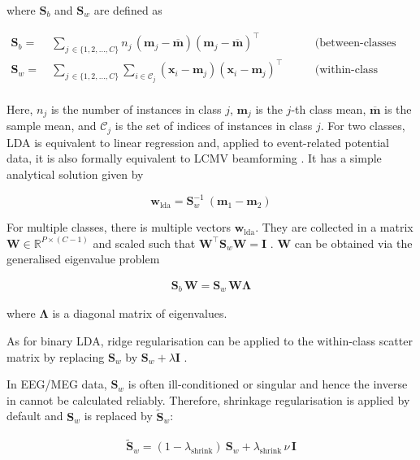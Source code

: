 \documentclass[utf8]{frontiersSCNS} %
\newcommand{\m}{\mathbf{m}}
\newcommand{\mbar}{\overline{\m}}
\newcommand{\mm}[1]{\m_{#1}}
\newcommand{\w}{\mathbf{w}}
\newcommand{\x}{\mathbf{x}}
\newcommand{\I}{\mathbf{I}}
\newcommand{\R}{\mathbb{R}}
\renewcommand{\S}{\mathbf{S}}
\newcommand{\W}{\mathbf{W}}
\begin{document}
where $\S_b$ and $\S_w$ are defined as

\begin{equation*}
\begin{alignedat}{2}
\S_b =\ & \sum_{j\,\in\{1,2,...,C\}}n_j\,(\mm{j} -\mbar) (\mm{j} - \mbar)^\top\ \quad &&\text{(between-classes scatter)}\\
\S_w =\ & \sum_{j\,\in\{1,2,...,C\}}\sum_{i\in\mathcal{C}_j} (\x_i - \mm{j})(\x_i - \mm{j})^\top\  \quad &&\text{(within-class scatter)}\\
\end{alignedat}
\end{equation*}

Here, $n_j$ is the number of instances in class $j$, $\m_j$ is the $j$-th class mean, $\mbar$ is the sample mean, and $\mathcal{C}_j$ is the set of indices of instances in class $j$. For two classes, LDA is equivalent to linear regression \cite{Treder2019DirectFDA} and, applied to event-related potential data, it is also formally equivalent to LCMV beamforming \cite{Treder2016}. It has a simple analytical solution given by

\begin{equation}
\label{eq:lda_solution}
\w_{\text{lda}} = \S_w^{-1}\ (\m_1 - \m_2)
\end{equation}

For multiple classes, there is multiple vectors $\w_{\text{lda}}$. They are collected in a matrix $\W\in\R^{P\times(C-1)}$ and scaled such that $\W^\top\S_w\W = \I$ \cite{Bishop2007}. $\W$ can be obtained via the generalised eigenvalue problem

\begin{align}
\label{eq:LDA-eigenvalue-multiclass}
\S_b\,\W = \S_w\,\W\mathbf{\Lambda}
\end{align}

where $\mathbf{\Lambda}$ is a diagonal matrix of eigenvalues.

As for binary LDA, ridge regularisation can be applied to the within-class scatter matrix by replacing $\S_w$ by $\S_w+\lambda\I$ \cite{Friedman1989}.

In EEG/MEG data, $\S_w$ is often ill-conditioned or singular and hence the inverse in  cannot be calculated reliably. Therefore, shrinkage regularisation is applied by default and $\S_w$ is replaced by $\widetilde{\S}_w$:

\begin{align}
\label{eq:shrinkage}
\widetilde{\S}_w = (1-\lambda_\text{shrink})\ \S_w + \lambda_\text{shrink}\,\nu\,\I
\end{align}
\end{document}

